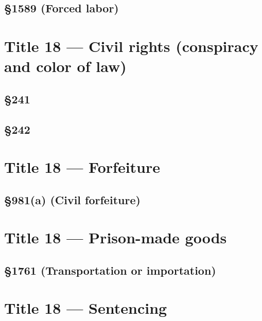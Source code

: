 \subsection*{§1589 (Forced labor)}
\label{apx:usc:18:1589}


\section*{Title 18 --- Civil rights (conspiracy and color of law)}

\subsection*{§241}
\label{apx:usc:18:241}


\subsection*{§242}
\label{apx:usc:18:242}


\section*{Title 18 --- Forfeiture}

\subsection*{§981(a) (Civil forfeiture)}
\label{apx:usc:18:981a}


\section*{Title 18 --- Prison-made goods}

\subsection*{§1761 (Transportation or importation)}
\label{apx:usc:18:1761}


\section*{Title 18 --- Sentencing}

